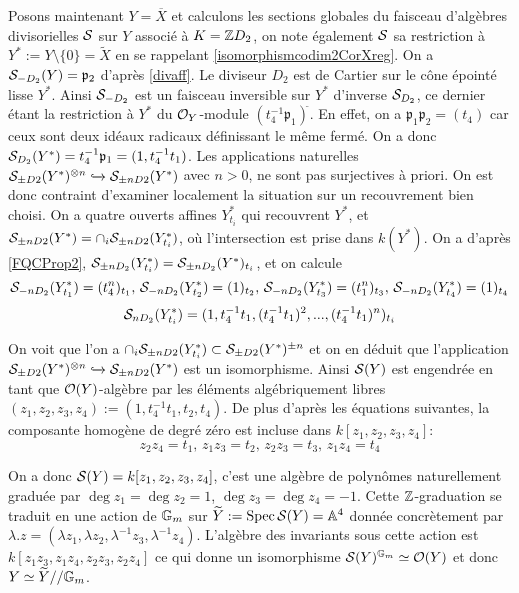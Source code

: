 Posons maintenant $Y=\overline{X}$ et calculons les sections globales du faisceau d'algèbres divisorielles $\mathcal{S}$ sur $Y$ associé à $K=\mathbb{Z} D_2$, on note également $\mathcal{S}$ sa restriction à $Y^*:=Y\setminus\lbrace0\rbrace=\widetilde{X}$ en se rappelant \ref{isomorphismcodim2CorXreg}. On a $\mathcal{S}_{-D_2}(Y)=\mathfrak{p}_2$ d'après \ref{divaff}. Le diviseur $D_2$ est de Cartier sur le cône épointé lisse $Y^*$. Ainsi $\mathcal{S}_{-D_2}$ est un faisceau inversible sur $Y^*$ d'inverse $\mathcal{S}_{D_2}$, ce dernier étant la restriction à $Y^*$ du $\mathcal{O}_{Y}$-module $(t_4^{-1}\mathfrak{p}_1)^{\widetilde{}}$. En effet, on a $\mathfrak{p}_1\mathfrak{p}_2=(t_4)$ car ceux sont deux idéaux radicaux définissant le même fermé.  On a donc $\mathcal{S}_{D_2}(Y^*)=t_4^{-1}\mathfrak{p}_1=(1, t_4^{-1}t_1)$. Les applications naturelles $\mathcal{S}_{\pm D2}(Y^*)^{\otimes n}\xhookrightarrow{} \mathcal{S}_{\pm nD2}(Y^*)$ avec $n>0$, ne sont pas surjectives à priori. On est donc contraint d'examiner localement la situation sur un recouvrement bien choisi. On a quatre ouverts affines $Y^*_{t_i}$ qui recouvrent $Y^*$, et $\mathcal{S}_{\pm nD2}(Y^*)=\cap_i \mathcal{S}_{\pm nD2}(Y^*_{t_i})$, où l'intersection est prise dans $k(Y^*)$. On a d'après \ref{FQCProp2}, $\mathcal{S}_{\pm nD_2}(Y^*_{t_i})=\mathcal{S}_{\pm nD_2}(Y^*)_{t_i}$, et on calcule 
$$\mathcal{S}_{-nD_2}(Y^*_{t_1})=(t_4^n)_{t_1},\,\mathcal{S}_{-nD_2}(Y^*_{t_2})=(1)_{t_2},\,\mathcal{S}_{-nD_2}(Y^*_{t_3})=(t_1^n)_{t_3},\,\mathcal{S}_{-nD_2}(Y^*_{t_4})=(1)_{t_4}$$
$$\mathcal{S}_{nD_2}(Y^*_{t_i})=(1,t_4^{-1}t_1,(t_4^{-1}t_1)^2,...,(t_4^{-1}t_1)^n)_{t_i}$$

On voit que l'on a $\cap_i \mathcal{S}_{\pm nD2}(Y^*_{t_i})\subset \mathcal{S}_{\pm D2}(Y^*)^{\pm n}$ et on en déduit que l'application $\mathcal{S}_{\pm D2}(Y^*)^{\otimes n}\xhookrightarrow{} \mathcal{S}_{\pm nD2}(Y^*)$ est un isomorphisme. Ainsi $\mathcal{S}(Y)$ est engendrée en tant que $\mathcal{O}(Y)$-algèbre par les éléments algébriquement libres $(z_1,z_2,z_3,z_4):=(1, t_4^{-1}t_1,t_2,t_4)$. De plus d'après les équations suivantes, la composante homogène de degré zéro est incluse dans $k[z_1,z_2,z_3,z_4]$:
$$ z_2z_4=t_1,\, z_1z_3=t_2,\, z_2z_3=t_3,\, z_1z_4=t_4$$

On a donc $\mathcal{S}(Y)=k[z_1,z_2,z_3,z_4]$, c'est une algèbre de polynômes naturellement graduée par $\deg z_1=\deg z_2=1$, $\deg z_3=\deg z_4=-1$. Cette $\mathbb{Z}$-graduation se traduit en une action de $\mathbb{G}_m$ sur $\widetilde{Y}:=\operatorname{Spec} \mathcal{S}(Y)=\mathbb{A}^4$ donnée concrètement par $\lambda.z=(\lambda z_1,\lambda z_2,\lambda^{-1} z_3,\lambda^{-1} z_4)$. L'algèbre des invariants sous cette action est $k[z_1z_3,z_1z_4,z_2z_3,z_2z_4]$ ce qui donne un isomorphisme $\mathcal{S}(Y)^{\mathbb{G}_m}\simeq \mathcal{O}(Y)$ et donc $Y\simeq \widetilde{Y}//\mathbb{G}_m$.

